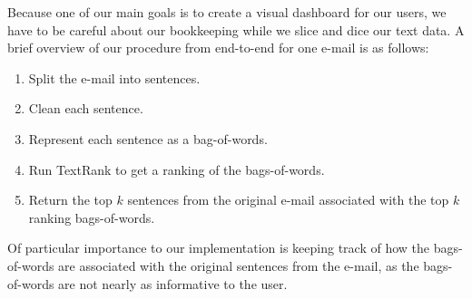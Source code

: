 Because one of our main goals is to create a visual dashboard for our users, we have to be careful about our bookkeeping while we slice and dice our text data. 
A brief overview of our procedure from end-to-end for one e-mail is as follows:
\singlespacing
\begin{enumerate}
\item Split the e-mail into sentences.
\item Clean each sentence.
\item Represent each sentence as a bag-of-words.
\item Run TextRank to get a ranking of the bags-of-words.
\item Return the top $k$ sentences from the original e-mail associated with the top $k$ ranking bags-of-words.
\end{enumerate}
\doublespacing
Of particular importance to our implementation is keeping track of how the bags-of-words are associated with the original sentences from the e-mail, as the bags-of-words are not nearly as informative to the user.